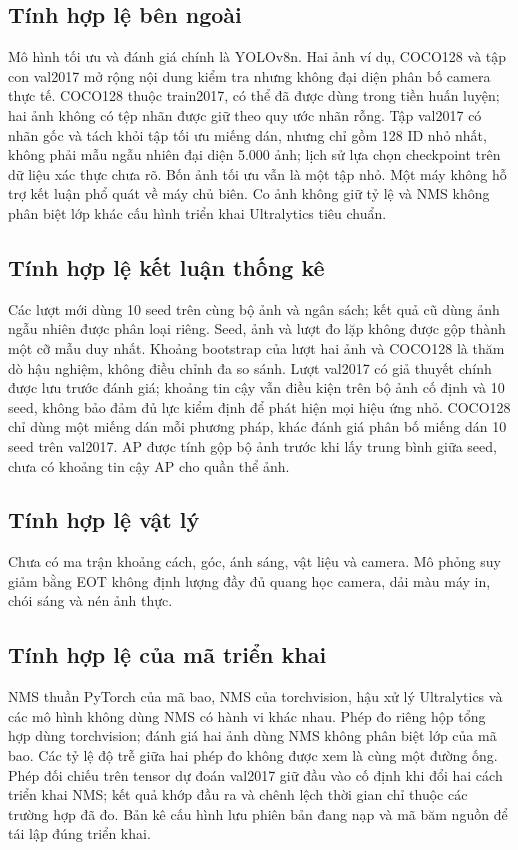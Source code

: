 \documentclass[a4paper,fleqn]{cas-dc}
\begin{document}
\subsection{Tính hợp lệ bên ngoài}

Mô hình tối ưu và đánh giá chính là YOLOv8n. Hai ảnh ví dụ, COCO128 và tập con val2017 mở rộng nội dung kiểm tra nhưng không đại diện phân bố camera thực tế. COCO128 thuộc train2017, có thể đã được dùng trong tiền huấn luyện; hai ảnh không có tệp nhãn được giữ theo quy ước nhãn rỗng. Tập val2017 có nhãn gốc và tách khỏi tập tối ưu miếng dán, nhưng chỉ gồm 128 ID nhỏ nhất, không phải mẫu ngẫu nhiên đại diện 5.000 ảnh; lịch sử lựa chọn checkpoint trên dữ liệu xác thực chưa rõ. Bốn ảnh tối ưu vẫn là một tập nhỏ. Một máy không hỗ trợ kết luận phổ quát về máy chủ biên. Co ảnh không giữ tỷ lệ và NMS không phân biệt lớp khác cấu hình triển khai Ultralytics tiêu chuẩn.

\subsection{Tính hợp lệ kết luận thống kê}

Các lượt mới dùng 10 seed trên cùng bộ ảnh và ngân sách; kết quả cũ dùng ảnh ngẫu nhiên được phân loại riêng. Seed, ảnh và lượt đo lặp không được gộp thành một cỡ mẫu duy nhất. Khoảng bootstrap của lượt hai ảnh và COCO128 là thăm dò hậu nghiệm, không điều chỉnh đa so sánh. Lượt val2017 có giả thuyết chính được lưu trước đánh giá; khoảng tin cậy vẫn điều kiện trên bộ ảnh cố định và 10 seed, không bảo đảm đủ lực kiểm định để phát hiện mọi hiệu ứng nhỏ. COCO128 chỉ dùng một miếng dán mỗi phương pháp, khác đánh giá phân bố miếng dán 10 seed trên val2017. AP được tính gộp bộ ảnh trước khi lấy trung bình giữa seed, chưa có khoảng tin cậy AP cho quần thể ảnh.

\subsection{Tính hợp lệ vật lý}

Chưa có ma trận khoảng cách, góc, ánh sáng, vật liệu và camera. Mô phỏng suy giảm bằng EOT không định lượng đầy đủ quang học camera, dải màu máy in, chói sáng và nén ảnh thực.

\subsection{Tính hợp lệ của mã triển khai}

NMS thuần PyTorch của mã bao, NMS của torchvision, hậu xử lý Ultralytics và các mô hình không dùng NMS có hành vi khác nhau. Phép đo riêng hộp tổng hợp dùng torchvision; đánh giá hai ảnh dùng NMS không phân biệt lớp của mã bao. Các tỷ lệ độ trễ giữa hai phép đo không được xem là cùng một đường ống. Phép đối chiếu trên tensor dự đoán val2017 giữ đầu vào cố định khi đổi hai cách triển khai NMS; kết quả khớp đầu ra và chênh lệch thời gian chỉ thuộc các trường hợp đã đo. Bản kê cấu hình lưu phiên bản đang nạp và mã băm nguồn để tái lập đúng triển khai.
\end{document}
